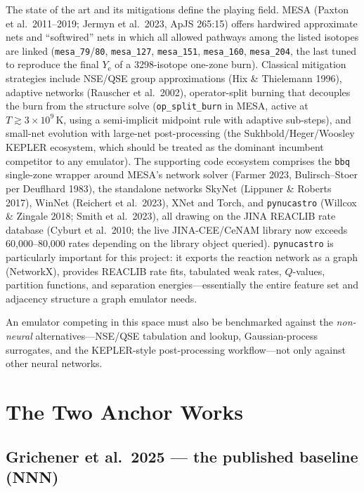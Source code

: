 \documentclass[11pt,a4paper]{article}
\newcommand{\Ye}{\ensuremath{Y_{\mathrm{e}}}}
\newcommand{\code}[1]{\texttt{#1}}
\begin{document}
The state of the art and its mitigations define the playing field. MESA (Paxton et al.\ 2011--2019; Jermyn et al.\ 2023, ApJS 265:15) offers hardwired approximate nets and ``softwired'' nets in which all allowed pathways among the listed isotopes are linked (\code{mesa\_79}/\code{80}, \code{mesa\_127}, \code{mesa\_151}, \code{mesa\_160}, \code{mesa\_204}, the last tuned to reproduce the final \Ye{} of a 3298-isotope one-zone burn). Classical mitigation strategies include NSE/QSE group approximations (Hix \& Thielemann 1996), adaptive networks (Rauscher et al.\ 2002), operator-split burning that decouples the burn from the structure solve (\code{op\_split\_burn} in MESA, active at $T \gtrsim 3\times10^{9}$\,K, using a semi-implicit midpoint rule with adaptive sub-steps), and small-net evolution with large-net post-processing (the Sukhbold/Heger/Woosley KEPLER ecosystem, which should be treated as the dominant incumbent competitor to any emulator). The supporting code ecosystem comprises the \code{bbq} single-zone wrapper around MESA's network solver (Farmer 2023, Bulirsch--Stoer per Deuflhard 1983), the standalone networks SkyNet (Lippuner \& Roberts 2017), WinNet (Reichert et al.\ 2023), XNet and Torch, and \code{pynucastro} (Willcox \& Zingale 2018; Smith et al.\ 2023), all drawing on the JINA REACLIB rate database (Cyburt et al.\ 2010; the live JINA-CEE/CeNAM library now exceeds 60{,}000--80{,}000 rates depending on the library object queried). \code{pynucastro} is particularly important for this project: it exports the reaction network as a graph (NetworkX), provides REACLIB rate fits, tabulated weak rates, $Q$-values, partition functions, and separation energies---essentially the entire feature set and adjacency structure a graph emulator needs.

An emulator competing in this space must also be benchmarked against the \emph{non-neural} alternatives---NSE/QSE tabulation and lookup, Gaussian-process surrogates, and the KEPLER-style post-processing workflow---not only against other neural networks.

\section{The Two Anchor Works}

\subsection{Grichener et al.\ 2025 --- the published baseline (NNN)}
\end{document}
